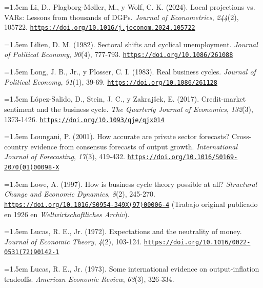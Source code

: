 \documentclass[10pt,a4paper]{article}
\begin{document}
\noindent\hangindent=1.5em Li, D., Plagborg-Møller, M., y Wolf, C. K. (2024). Local projections vs. VARs: Lessons from thousands of DGPs. \textit{Journal of Econometrics}, \textit{244}(2), 105722. \href{https://doi.org/10.1016/j.jeconom.2024.105722}{\nolinkurl{https://doi.org/10.1016/j.jeconom.2024.105722}}

\noindent\hangindent=1.5em Lilien, D. M. (1982). Sectoral shifts and cyclical unemployment. \textit{Journal of Political Economy}, \textit{90}(4), 777-793. \href{https://doi.org/10.1086/261088}{\nolinkurl{https://doi.org/10.1086/261088}}

\noindent\hangindent=1.5em Long, J. B., Jr., y Plosser, C. I. (1983). Real business cycles. \textit{Journal of Political Economy}, \textit{91}(1), 39-69. \href{https://doi.org/10.1086/261128}{\nolinkurl{https://doi.org/10.1086/261128}}

\noindent\hangindent=1.5em López-Salido, D., Stein, J. C., y Zakrajšek, E. (2017). Credit-market sentiment and the business cycle. \textit{The Quarterly Journal of Economics}, \textit{132}(3), 1373-1426. \href{https://doi.org/10.1093/qje/qjx014}{\nolinkurl{https://doi.org/10.1093/qje/qjx014}}

\noindent\hangindent=1.5em Loungani, P. (2001). How accurate are private sector forecasts? Cross-country evidence from consensus forecasts of output growth. \textit{International Journal of Forecasting}, \textit{17}(3), 419-432. \href{https://doi.org/10.1016/S0169-2070(01)00098-X}{\nolinkurl{https://doi.org/10.1016/S0169-2070(01)00098-X}}

{\sloppy\noindent\hangindent=1.5em Lowe, A. (1997). How is business cycle theory possible at all? \textit{Structural Change and Economic Dynamics}, \textit{8}(2), 245-270. \href{https://doi.org/10.1016/S0954-349X(97)00006-4}{\nolinkurl{https://doi.org/10.1016/S0954-349X(97)00006-4}} (Trabajo original publicado en 1926 en \textit{Weltwirtschaftliches Archiv}).\par}

\noindent\hangindent=1.5em Lucas, R. E., Jr. (1972). Expectations and the neutrality of money. \textit{Journal of Economic Theory}, \textit{4}(2), 103-124. \href{https://doi.org/10.1016/0022-0531(72)90142-1}{\nolinkurl{https://doi.org/10.1016/0022-0531(72)90142-1}}

\noindent\hangindent=1.5em Lucas, R. E., Jr. (1973). Some international evidence on output-inflation tradeoffs. \textit{American Economic Review}, \textit{63}(3), 326-334.
\end{document}

